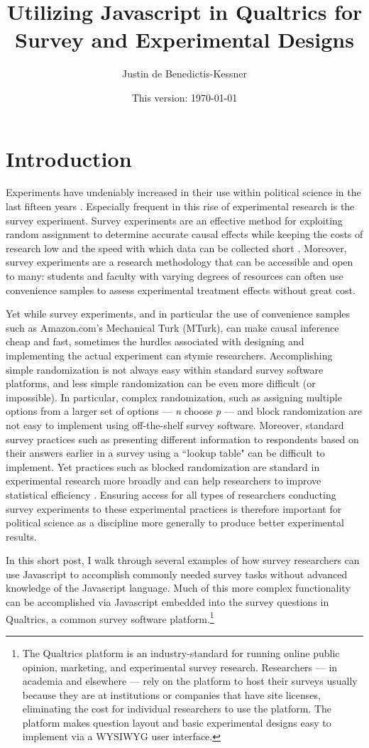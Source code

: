 \documentclass[12pt]{article}
\title{Utilizing Javascript in Qualtrics for Survey and Experimental Designs}
\author{Justin de Benedictis-Kessner}
\date{This version: \today}                                           %
\begin{document}
\maketitle
\section{Introduction}

Experiments have undeniably increased in their use within political science in the last fifteen years \citep{druckman2006growth}. Especially frequent in this rise of experimental research is the survey experiment. Survey experiments are an effective method for exploiting random assignment to determine accurate causal effects while keeping the costs of research low and the speed with which data can be collected short \citep{mullinix2015generalizability}. Moreover, survey experiments are a research methodology that can be accessible and open to many: students and faculty with varying degrees of resources can often use convenience samples to assess experimental treatment effects without great cost.

Yet while survey experiments, and in particular the use of convenience samples such as Amazon.com's Mechanical Turk (MTurk), can make causal inference cheap and fast, sometimes the hurdles associated with designing and implementing the actual experiment can stymie researchers. Accomplishing simple randomization is not always easy within standard survey software platforms, and less simple randomization can be even more difficult (or impossible). In particular, complex randomization, such as assigning multiple options from a larger set of options --- \emph{n} choose \emph{p} --- and block randomization are not easy to implement using off-the-shelf survey software. Moreover, standard survey practices such as presenting different information to respondents based on their answers earlier in a survey using a ``lookup table" can be difficult to implement. Yet practices such as blocked randomization are standard in experimental research more broadly and can help researchers to improve statistical efficiency \citep[e.g.,][]{horiuchi2007designing, imai2008misunderstandings, moore2012multivariate}. Ensuring access for all types of researchers conducting survey experiments to these experimental practices is therefore important for political science as a discipline more generally to produce better experimental results.

In this short post, I walk through several examples of how survey researchers can use Javascript to accomplish commonly needed survey tasks without advanced knowledge of the Javascript language. Much of this more complex functionality can be accomplished via Javascript embedded into the survey questions in Qualtrics, a common survey software platform.\footnote{The Qualtrics platform is an industry-standard for running online public opinion, marketing, and experimental survey research. Researchers --- in academia and elsewhere ---  rely on the platform to host their surveys usually because they are at institutions or companies that have site licenses, eliminating the cost for individual researchers to use the platform. The platform makes question layout and basic experimental designs easy to implement via a WYSIWYG user interface.}
\end{document}
